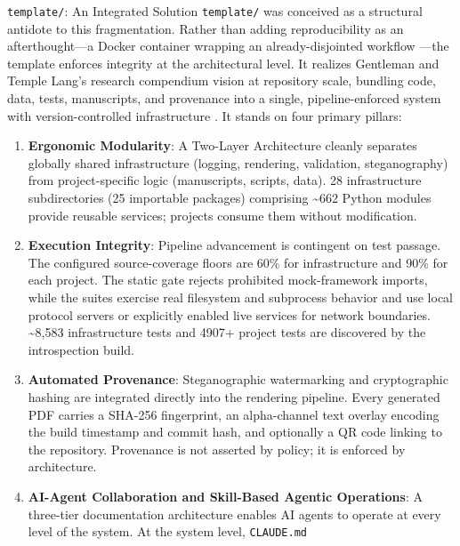 \documentclass[
  ignorenonframetext,
]{beamer}
\begin{document}
\begin{frame}{\texttt{template/}: An
Integrated Solution}
\protect{}\label{template-an-integrated-solution}
\texttt{template/} was conceived as a structural antidote to this
fragmentation. Rather than adding reproducibility as an afterthought---a
Docker container wrapping an already-disjointed workflow
---the template enforces integrity at the
architectural level. It realizes Gentleman and Temple Lang's research
compendium vision  at repository scale,
bundling code, data, tests, manuscripts, and provenance into a single,
pipeline-enforced system with version-controlled infrastructure
. It stands on four primary pillars:

\begin{enumerate}
\item
  \textbf{Ergonomic Modularity}: A Two-Layer Architecture cleanly
  separates globally shared infrastructure (logging, rendering,
  validation, steganography) from project-specific logic (manuscripts,
  scripts, data). 28 infrastructure subdirectories (25 importable
  packages) comprising \textasciitilde662 Python modules provide
  reusable services; projects consume them without modification.
\item
  \textbf{Execution Integrity}: Pipeline advancement is contingent on
  test passage. The configured source-coverage floors are 60\% for
  infrastructure and 90\% for each project. The static gate rejects
  prohibited mock-framework imports, while the suites exercise real
  filesystem and subprocess behavior and use local protocol servers or
  explicitly enabled live services for network boundaries.
  \textasciitilde8,583 infrastructure tests and 4907+ project tests are
  discovered by the introspection build.
\item
  \textbf{Automated Provenance}: Steganographic watermarking and
  cryptographic hashing are integrated directly into the rendering
  pipeline. Every generated PDF carries a SHA-256 fingerprint, an
  alpha-channel text overlay encoding the build timestamp and commit
  hash, and optionally a QR code linking to the repository. Provenance
  is not asserted by policy; it is enforced by architecture.
\item
  \textbf{AI-Agent Collaboration and Skill-Based Agentic Operations}: A
  three-tier documentation architecture enables AI agents to operate at
  every level of the system. At the system level, \texttt{CLAUDE.md}

\end{enumerate}
\end{frame}
\end{document}
